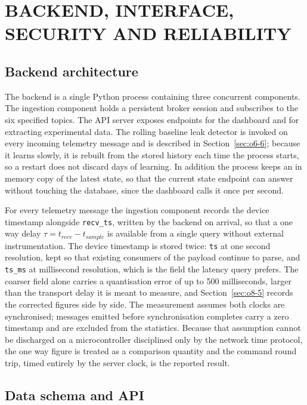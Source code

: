 \chapter{BACKEND, INTERFACE, SECURITY AND RELIABILITY}
\label{chap:platform}

\section{Backend architecture}
\label{sec:o5-1}

The backend is a single Python process containing three concurrent components. The ingestion component holds a persistent broker session and subscribes to the six specified topics. The API server exposes endpoints for the dashboard and for extracting experimental data. The rolling baseline leak detector is invoked on every incoming telemetry message and is described in Section~\ref{sec:o6-6}; because it learns slowly, it is rebuilt from the stored history each time the process starts, so a restart does not discard days of learning. In addition the process keeps an in memory copy of the latest state, so that the current state endpoint can answer without touching the database, since the dashboard calls it once per second.

For every telemetry message the ingestion component records the device timestamp alongside \texttt{recv\_ts}, written by the backend on arrival, so that a one way delay $\tau = t_{recv} - t_{sample}$ is available from a single query without external instrumentation. The device timestamp is stored twice: \texttt{ts} at one second resolution, kept so that existing consumers of the payload continue to parse, and \texttt{ts\_ms} at millisecond resolution, which is the field the latency query prefers. The coarser field alone carries a quantisation error of up to 500 milliseconds, larger than the transport delay it is meant to measure, and Section~\ref{sec:o8-5} records the corrected figures side by side. The measurement assumes both clocks are synchronised; messages emitted before synchronisation completes carry a zero timestamp and are excluded from the statistics. Because that assumption cannot be discharged on a microcontroller disciplined only by the network time protocol, the one way figure is treated as a comparison quantity and the command round trip, timed entirely by the server clock, is the reported result.

\section{Data schema and API}
\label{sec:o5-2}

